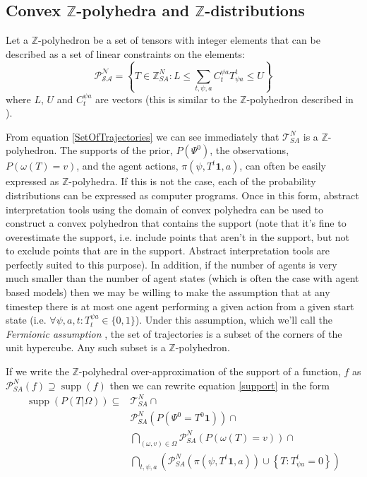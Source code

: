 \documentclass{article}
\DeclareMathOperator\supp{supp}
\begin{document}
\subsection{Convex $\mathbb{Z}$-polyhedra and $\mathbb{Z}$-distributions}
\label{BPoly}

Let a $\mathbb{Z}$-polyhedron be a set of tensors with integer elements that can be described as a set of linear constraints on the elements: 
\[
\mathcal{P^N_{SA}} = \left\{ T\in\mathbb{\mathbb{Z}}^N_{SA} : L \le \sum_{t,\psi,a} C^{\psi a}_{t} T^t_{\psi a} \le U \right\}
\]
where $L$,  $U$ and $C^{\psi a}_t$ are vectors (this is similar to the $\mathbb{Z}$-polyhedron described in \cite{quinton1996manipulating}).

From equation \ref{SetOfTrajectories} we can see immediately that $\mathcal{T}^N_{SA}$ is a  $\mathbb{Z}$-polyhedron. The supports of the prior, $P(\Psi^0)$, the observations, $P(\omega(T)=v)$, and the agent actions, $\pi(\psi,T^t\mathbf{1},a)$, can often be easily expressed as $\mathbb{Z}$-polyhedra. If this is not the case, each of the probability distributions can be expressed as computer programs. Once in this form, abstract interpretation tools\cite{cousot1977abstract} using the domain of convex polyhedra  \cite{cousot1978automatic}\cite{becchi2018efficient}\cite{fukuda2020polyhedral} can be used to construct a convex polyhedron that contains the support (note that it's fine to overestimate the support, i.e. include points that aren't in the support, but not to exclude points that are in the support. Abstract interpretation tools\cite{henry2012pagai}\cite{GN2021} are perfectly suited to this purpose). In addition, if the number of agents is very much smaller than the number of agent states (which is often the case with agent based models) then we may be willing to make the assumption that at any timestep there is at most one agent performing a given action from a given start state (i.e. $\forall \psi, a, t: T^{\psi a}_t \in \{0,1\}$). Under this assumption, which we'll call the \textit{Fermionic assumption} , the set of trajectories is a subset of the corners of the unit hypercube. Any such subset is a $\mathbb{Z}$-polyhedron.

If we write the $\mathbb{Z}$-polyhedral over-approximation of the support of a function, $f$ as  $\mathcal{P}^N_{SA}(f)  \supseteq \supp(f)$
then we can rewrite equation \eqref{support} in the form
\begin{equation}
\begin{aligned}
\supp(P( T |\Omega)) \subseteq 
& \mathcal{T}^N_{SA} \cap \\
& \mathcal{P}^N_{SA}(P(\Psi^0 = T^0\mathbf{1})) \cap\\
& \bigcap_{(\omega,v) \in \Omega}   \mathcal{P}^N_{SA}\left(P\left(\omega(T)=v\right)\right) \cap \\
& \bigcap_{t,\psi, a}
\left(\mathcal{P}^N_{SA}\left(\pi(\psi,T^t\mathbf{1},a)\right)
\cup
\left\{T: T^t_{\psi a} = 0\right\}\right)
\\
\end{aligned}
\label{polyhedralSupport}
\end{equation}
\end{document}
